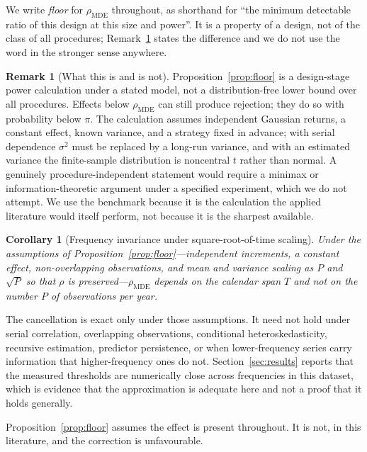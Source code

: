\documentclass{article}
\theoremstyle{plain}
\newtheorem{corollary}[theorem]{Corollary}
\theoremstyle{definition}
\newtheorem{remark}[theorem]{Remark}
\begin{document}
We write \emph{floor} for $\rho_{\mathrm{MDE}}$ throughout, as shorthand for ``the minimum
detectable ratio of this design at this size and power''. It is a property of a design, not of
the class of all procedures; Remark~\ref{rem:notimpossibility} states the difference and we do
not use the word in the stronger sense anywhere.

\begin{remark}[What this is and is not]
\label{rem:notimpossibility}
Proposition~\ref{prop:floor} is a design-stage power calculation under a stated model, not a
distribution-free lower bound over all procedures. Effects below $\rho_{\mathrm{MDE}}$ can still
produce rejection; they do so with probability below $\pi$. The calculation assumes independent
Gaussian returns, a constant effect, known variance, and a strategy fixed in advance; with
serial dependence $\sigma^2$ must be replaced by a long-run variance, and with an estimated
variance the finite-sample distribution is noncentral $t$ rather than normal. A genuinely
procedure-independent statement would require a minimax or information-theoretic argument under
a specified experiment, which we do not attempt. We use the benchmark because it is the
calculation the applied literature would itself perform, not because it is the sharpest
available.
\end{remark}

\begin{corollary}[Frequency invariance under square-root-of-time scaling]
\label{cor:frequency}
Under the assumptions of Proposition~\ref{prop:floor}---independent increments, a constant
effect, non-overlapping observations, and mean and variance scaling as $P$ and $\sqrt{P}$ so
that $\rho$ is preserved---$\rho_{\mathrm{MDE}}$ depends on the calendar span $T$ and not on the
number $P$ of observations per year.
\end{corollary}

The cancellation is exact only under those assumptions. It need not hold under serial
correlation, overlapping observations, conditional heteroskedasticity, recursive estimation,
predictor persistence, or when lower-frequency series carry information that higher-frequency
ones do not. Section~\ref{sec:results} reports that the measured thresholds are numerically
close across frequencies in this dataset, which is evidence that the approximation is adequate
here and not a proof that it holds generally.

Proposition~\ref{prop:floor} assumes the effect is present throughout. It is not, in this
literature, and the correction is unfavourable.
\end{document}
